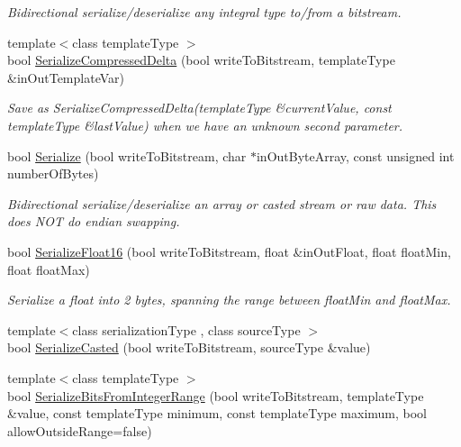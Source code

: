 \begin{DoxyCompactItemize}
\begin{DoxyCompactList}\small\item\em Bidirectional serialize/deserialize any integral type to/from a bitstream. \end{DoxyCompactList}\item 
{\footnotesize template$<$class template\-Type $>$ }\\bool \hyperlink{class_rak_net_1_1_bit_stream_ad1ca9bf6bb61905e43003097d7af79fe}{Serialize\-Compressed\-Delta} (bool write\-To\-Bitstream, template\-Type \&in\-Out\-Template\-Var)
\begin{DoxyCompactList}\small\item\em Save as Serialize\-Compressed\-Delta(template\-Type \&current\-Value, const template\-Type \&last\-Value) when we have an unknown second parameter. \end{DoxyCompactList}\item 
bool \hyperlink{class_rak_net_1_1_bit_stream_ad2e3ec310191a69b9bba227a72e65537}{Serialize} (bool write\-To\-Bitstream, char $\ast$in\-Out\-Byte\-Array, const unsigned int number\-Of\-Bytes)
\begin{DoxyCompactList}\small\item\em Bidirectional serialize/deserialize an array or casted stream or raw data. This does N\-O\-T do endian swapping. \end{DoxyCompactList}\item 
bool \hyperlink{class_rak_net_1_1_bit_stream_a1aebab1c543acd21742f380c95255365}{Serialize\-Float16} (bool write\-To\-Bitstream, float \&in\-Out\-Float, float float\-Min, float float\-Max)
\begin{DoxyCompactList}\small\item\em Serialize a float into 2 bytes, spanning the range between {\itshape float\-Min} and {\itshape float\-Max}. \end{DoxyCompactList}\item 
{\footnotesize template$<$class serialization\-Type , class source\-Type $>$ }\\bool \hyperlink{class_rak_net_1_1_bit_stream_a3615fc88c34f910085e0f94a6231926b}{Serialize\-Casted} (bool write\-To\-Bitstream, source\-Type \&value)
\item 
{\footnotesize template$<$class template\-Type $>$ }\\bool \hyperlink{class_rak_net_1_1_bit_stream_a9cfb0266bf435e0bba8b221f089a4aec}{Serialize\-Bits\-From\-Integer\-Range} (bool write\-To\-Bitstream, template\-Type \&value, const template\-Type minimum, const template\-Type maximum, bool allow\-Outside\-Range=false)

\end{DoxyCompactItemize}

